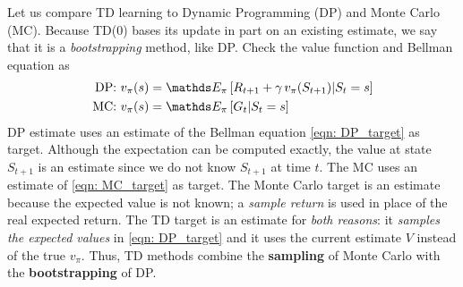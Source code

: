 \documentclass[11pt]{article}
\begin{document}
Let us compare TD learning  to Dynamic Programming (DP) and Monte Carlo (MC). Because TD($0$) bases its update in part on an existing estimate, we say that it is a
\emph{bootstrapping} method, like DP. Check the value function and Bellman equation as 
\begin{align}
\text{DP: }v_{\pi}(s) &=  \E{\pi}{R_{t+1}  + \gamma\,v_{\pi}(S_{t+1}) | S_{t} = s} \label{eqn: DP_target} \\
\text{MC: }v_{\pi}(s) &=  \E{\pi}{G_{t} | S_{t} = s}  \label{eqn: MC_target}
\end{align} DP estimate uses an estimate of the Bellman equation \eqref{eqn: DP_target} as target. Although the expectation can be computed exactly, the value at state $S_{t+1}$ is an estimate since we do not know $S_{t+1}$ at time $t$. The MC uses an estimate of \eqref{eqn: MC_target} as target. The Monte Carlo target is an estimate because the expected value is not known; a \emph{sample return} is used in place of the real expected return. The TD target is an estimate for \emph{both reasons}: it \emph{samples the expected values} in \eqref{eqn: DP_target} and it uses the current estimate $V$ instead of the true $v_{\pi}$. Thus, TD methods combine the \textbf{sampling} of Monte Carlo with the \textbf{bootstrapping} of DP.
\end{document}

